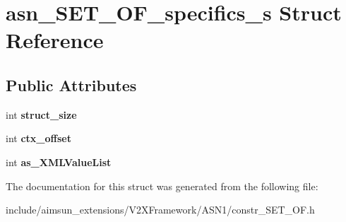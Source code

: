 \hypertarget{structasn__SET__OF__specifics__s}{}\section{asn\+\_\+\+S\+E\+T\+\_\+\+O\+F\+\_\+specifics\+\_\+s Struct Reference}
\label{structasn__SET__OF__specifics__s}
\subsection*{Public Attributes}
\begin{DoxyCompactItemize}
\item 
int {\bfseries struct\+\_\+size}\hypertarget{structasn__SET__OF__specifics__s_a441cca370f35fd73e231ffa1923d0dc2}{}\label{structasn__SET__OF__specifics__s_a441cca370f35fd73e231ffa1923d0dc2}

\item 
int {\bfseries ctx\+\_\+offset}\hypertarget{structasn__SET__OF__specifics__s_a1af400a4257bf2dd278ed11c254a4df4}{}\label{structasn__SET__OF__specifics__s_a1af400a4257bf2dd278ed11c254a4df4}

\item 
int {\bfseries as\+\_\+\+X\+M\+L\+Value\+List}\hypertarget{structasn__SET__OF__specifics__s_a01f688079a44819a7647c4b5900fd2c6}{}\label{structasn__SET__OF__specifics__s_a01f688079a44819a7647c4b5900fd2c6}

\end{DoxyCompactItemize}


The documentation for this struct was generated from the following file\+:\begin{DoxyCompactItemize}
\item 
include/aimsun\+\_\+extensions/\+V2\+X\+Framework/\+A\+S\+N1/constr\+\_\+\+S\+E\+T\+\_\+\+O\+F.\+h\end{DoxyCompactItemize}
